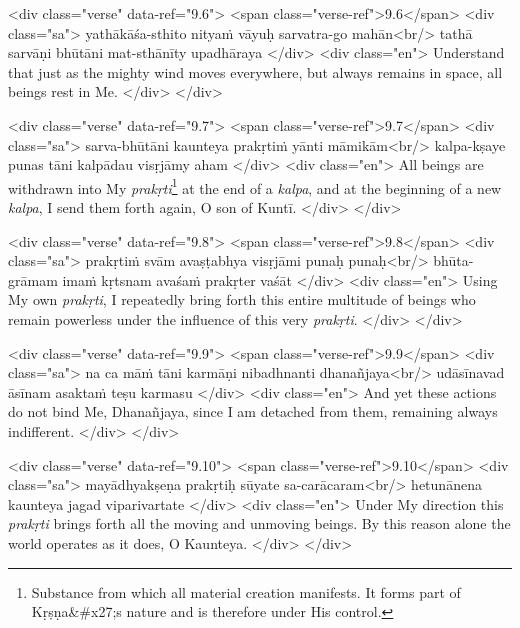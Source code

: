 \begin{html}
<div class="verse" data-ref="9.6">
  <span class="verse-ref">9.6</span>
  <div class="sa">
    yathākāśa-sthito nityaṁ vāyuḥ sarvatra-go mahān<br/>
    tathā sarvāṇi bhūtāni mat-sthānīty upadhāraya
  </div>
  <div class="en">
    Understand that just as the mighty wind moves everywhere, but always remains in space, all beings rest in Me.
  </div>
</div>
\end{html}



\begin{html}
<div class="verse" data-ref="9.7">
  <span class="verse-ref">9.7</span>
  <div class="sa">
    sarva-bhūtāni kaunteya prakṛtiṁ yānti māmikām<br/>
    kalpa-kṣaye punas tāni kalpādau visṛjāmy aham
  </div>
  <div class="en">
    All beings are withdrawn into My \textit{prakṛti}\footnote{Substance from which all material creation manifests. It forms part of Kṛṣṇa&#x27;s nature and is therefore under His control.} at the end of a \textit{kalpa}, and at the beginning of a new \textit{kalpa}, I send them forth again, O son of Kuntī.
  </div>
</div>
\end{html}



\begin{html}
<div class="verse" data-ref="9.8">
  <span class="verse-ref">9.8</span>
  <div class="sa">
    prakṛtiṁ svām avaṣṭabhya visṛjāmi punaḥ punaḥ<br/>
    bhūta-grāmam imaṁ kṛtsnam avaśaṁ prakṛter vaśāt
  </div>
  <div class="en">
    Using My own \textit{prakṛti}, I repeatedly bring forth this entire multitude of beings who remain powerless under the influence of this very \textit{prakṛti}.
  </div>
</div>
\end{html}



\begin{html}
<div class="verse" data-ref="9.9">
  <span class="verse-ref">9.9</span>
  <div class="sa">
    na ca māṁ tāni karmāṇi nibadhnanti dhanañjaya<br/>
    udāsīnavad āsīnam asaktaṁ teṣu karmasu
  </div>
  <div class="en">
    And yet these actions do not bind Me, Dhanañjaya, since I am detached from them, remaining always indifferent.
  </div>
</div>
\end{html}



\begin{html}
<div class="verse" data-ref="9.10">
  <span class="verse-ref">9.10</span>
  <div class="sa">
    mayādhyakṣeṇa prakṛtiḥ sūyate sa-carācaram<br/>
    hetunānena kaunteya jagad viparivartate
  </div>
  <div class="en">
    Under My direction this \textit{prakṛti} brings forth all the moving and unmoving beings. By this reason alone the world operates as it does, O Kaunteya.
  </div>
</div>
\end{html}


